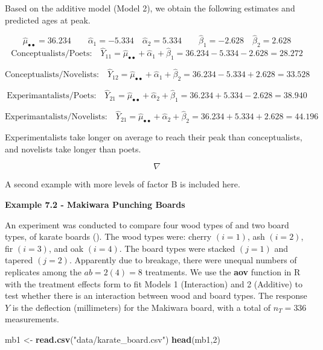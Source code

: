 \documentclass[
]{book}
\newenvironment{Shaded}{\begin{snugshade}}{\end{snugshade}}
\newcommand{\DecValTok}[1]{\textcolor[rgb]{0.00,0.00,0.81}{#1}}
\newcommand{\FunctionTok}[1]{\textcolor[rgb]{0.13,0.29,0.53}{\textbf{#1}}}
\newcommand{\NormalTok}[1]{#1}
\newcommand{\OtherTok}[1]{\textcolor[rgb]{0.56,0.35,0.01}{#1}}
\newcommand{\StringTok}[1]{\textcolor[rgb]{0.31,0.60,0.02}{#1}}
\begin{document}
Based on the additive model (Model 2), we obtain the following estimates
and predicted ages at peak.

\[
\hat{\mu}_{\bullet\bullet}=36.234 \qquad \hat{\alpha}_1=-5.334 \quad
\hat{\alpha}_2=5.334 \qquad \hat{\beta}_1=-2.628 \quad
\hat{\beta}_2=2.628
\] \[
\mbox{Conceptualists/Poets:} \quad 
\hat{Y}_{11}=\hat{\mu}_{\bullet\bullet}+\hat{\alpha}_1+\hat{\beta}_1=
36.234-5.334-2.628=28.272
\]

\[
\mbox{Conceptualists/Novelists:} \quad 
\hat{Y}_{12}=\hat{\mu}_{\bullet\bullet}+\hat{\alpha}_1+\hat{\beta}_2=
36.234-5.334+2.628=33.528
\]

\[
\mbox{Experimantalists/Poets:} \quad 
\hat{Y}_{21}=\hat{\mu}_{\bullet\bullet}+\hat{\alpha}_2+\hat{\beta}_1=
36.234+5.334-2.628=38.940
\]

\[
\mbox{Experimantalists/Novelists:} \quad 
\hat{Y}_{21}=\hat{\mu}_{\bullet\bullet}+\hat{\alpha}_2+\hat{\beta}_2=
36.234+5.334+2.628=44.196
\]

Experimentalists take longer on average to reach their peak than
conceptualists, and novelists take longer than poets.

\[\nabla \]

A second example with more levels of factor B is included here.

\textbf{Example 7.2 - Makiwara Punching Boards}

An experiment was conducted to compare four wood types of and two board
types, of karate boards (). The wood types were: cherry \((i=1)\), ash
\((i=2)\), fir \((i=3)\), and oak \((i=4)\). The board types were
stacked \((j=1)\) and tapered \((j=2)\). Apparently due to breakage,
there were unequal numbers of replicates among the \(ab=2(4)=8\)
treatments. We use the \textbf{aov} function in R with the treatment
effects form to fit Models 1 (Interaction) and 2 (Additive) to test
whether there is an interaction between wood and board types. The
response \(Y\) is the deflection (millimeters) for the Makiwara board,
with a total of \(n_T=336\) measurements.

\begin{Shaded}
\begin{Highlighting}[]
\NormalTok{mb1 }\OtherTok{\textless{}{-}} \FunctionTok{read.csv}\NormalTok{(}\StringTok{"data/karate\_board.csv"}\NormalTok{)}
\FunctionTok{head}\NormalTok{(mb1,}\DecValTok{2}\NormalTok{)}
\end{Highlighting}
\end{Shaded}
\end{document}
